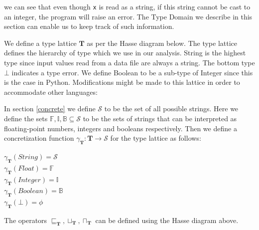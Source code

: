 \documentclass[10pt]{report}
\begin{document}
we can see that even though \verb|x| is read as a string, if this string cannot be cast to an integer, the program will raise an error. The Type Domain we describe in this section can enable us to keep track of such information. 

We define a type lattice $ \mathbf{T} $ as per the Hasse diagram below. The type lattice defines the hierarchy of type which we use in our analysis. String is the highest type since input values read from a data file are always a string. The bottom type $ \bot $ indicates a type error. We define Boolean to be a sub-type of Integer since this is the case in Python. Modifications might be made to this lattice in order to accommodate other languages: \\
\begin{center}
\end{center}

In section \ref{concrete} we define $ \mathcal{S} $ to be the set of all possible strings. Here we define the sets $ \mathbb{F}, \mathbb{I}, \mathbb{B} \subseteq \mathcal{S} $ to be the sets of strings that can be interpreted as floating-point numbers, integers and booleans respectively. Then we define a concretization function $ \gamma_{\mathbf{T}}: \mathbf{T} \longrightarrow \mathcal{S} $ for the type lattice as follows: 
\begin{center}
 $ \gamma_{\mathbf{T}}(String) = \mathcal{S} $ \\
 $ \gamma_{\mathbf{T}}(Float) = \mathbb{F} $ \\
  $ \gamma_{\mathbf{T}}(Integer) = \mathbb{I} $ \\
   $ \gamma_{\mathbf{T}}(Boolean) = \mathbb{B} $ \\
    $ \gamma_{\mathbf{T}}(\bot) = \phi $

\end{center}
The operators $ \sqsubseteq_{\mathbf{T}}, \sqcup_{\mathbf{T}}, \sqcap_{\mathbf{T}} $ can be defined using the Hasse diagram above. \\
\end{document}

